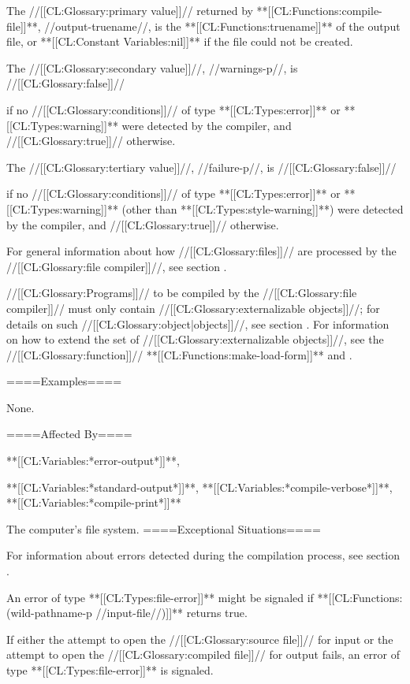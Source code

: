 The //[[CL:Glossary:primary value]]// returned by **[[CL:Functions:compile-file]]**, //output-truename//, is the **[[CL:Functions:truename]]** of the output file, or **[[CL:Constant Variables:nil]]** if the file could not be created.

The //[[CL:Glossary:secondary value]]//, //warnings-p//, is //[[CL:Glossary:false]]//

if no //[[CL:Glossary:conditions]]// of type **[[CL:Types:error]]** or **[[CL:Types:warning]]** were detected by the compiler, and //[[CL:Glossary:true]]// otherwise.

The //[[CL:Glossary:tertiary value]]//, //failure-p//, is //[[CL:Glossary:false]]//

if no //[[CL:Glossary:conditions]]// of type **[[CL:Types:error]]** or **[[CL:Types:warning]]** (other than **[[CL:Types:style-warning]]**) were detected by the compiler, and //[[CL:Glossary:true]]// otherwise.

For general information about how //[[CL:Glossary:files]]// are processed by the //[[CL:Glossary:file compiler]]//, see section {\secref\FileCompilation}.



//[[CL:Glossary:Programs]]// to be compiled by the //[[CL:Glossary:file compiler]]// must only contain //[[CL:Glossary:externalizable objects]]//; for details on such //[[CL:Glossary:object|objects]]//, see section {\secref\LiteralsInCompiledFiles}. For information on how to extend the set of //[[CL:Glossary:externalizable objects]]//, see the //[[CL:Glossary:function]]// **[[CL:Functions:make-load-form]]** and \secref\CallingMakeLoadForm.

====Examples====

None.

====Affected By====

**[[CL:Variables:*error-output*]]**,

**[[CL:Variables:*standard-output*]]**, **[[CL:Variables:*compile-verbose*]]**, **[[CL:Variables:*compile-print*]]**

The computer's file system. ====Exceptional Situations====

For information about errors detected during the compilation process, see section {\secref\FileCompilerExceptions}.

An error of type **[[CL:Types:file-error]]** might be signaled if **[[CL:Functions:(wild-pathname-p //input-file//)\/]]** returns true.

If either the attempt to open the //[[CL:Glossary:source file]]// for input or the attempt to open the //[[CL:Glossary:compiled file]]// for output fails, an error of type **[[CL:Types:file-error]]** is signaled.

